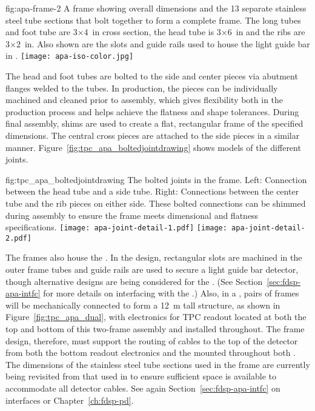 \begin{dunefigure}{fig:apa-frame-2}
{A   frame showing overall dimensions and the \num{13} separate stainless steel tube sections that bolt together to form a complete frame.  The long tubes and foot tube are 3$\times$\SI{4}{in} cross section, the head tube is 3$\times$\SI{6}{in} and the ribs are \num{3}$\times$\SI{2}{in}. Also shown are the slots and guide rails used to house the light guide bar  in .}
\texttt{[image: apa-iso-color.jpg]} 
\end{dunefigure}

The head and foot tubes are bolted to the side and center pieces via abutment flanges welded to the tubes. In production, the pieces can be individually machined and cleaned prior to assembly, which gives flexibility both in the production process and helps achieve the flatness and shape tolerances.  During final assembly, shims are used to create a flat, rectangular frame of the specified dimensions.  The central cross pieces are attached to the side pieces in a similar manner.  Figure~\ref{fig:tpc_apa_boltedjointdrawing} shows models of the different joints.   

\begin{dunefigure}{fig:tpc_apa_boltedjointdrawing}
{The bolted joints in the  frame. Left: Connection between the head tube and a side tube. Right: Connections between the center tube and the rib pieces on either side.  These bolted connections can be shimmed during assembly to ensure the frame meets dimensional and flatness specifications.}
\texttt{[image: apa-joint-detail-1.pdf]} \quad
\texttt{[image: apa-joint-detail-2.pdf]} 
\end{dunefigure}

The  frames also house the .  In the  design, rectangular slots are machined in the outer frame tubes and guide rails are used to secure a light guide bar detector, though alternative  designs are being considered for the . %
(See Section~\ref{sec:fdsp-apa-intfc} for more details on interfacing with the .)   Also, in a , pairs of  frames will be mechanically connected to form a \SI{12}{m} tall structure, as shown in Figure~\ref{fig:tpc_apa_dual}, with electronics for TPC readout located at both the top and bottom of this two-frame assembly and  installed throughout.  The  frame design, therefore, must support the routing of cables to the top of the detector from both the bottom  readout electronics and the  mounted throughout both .  The dimensions of the stainless steel tube sections used in the frame are currently being revisited from that used in  to ensure sufficient space is available to accommodate all detector cables.  See again Section~\ref{sec:fdsp-apa-intfc} on interfaces or Chapter~\ref{ch:fdsp-pd}.

